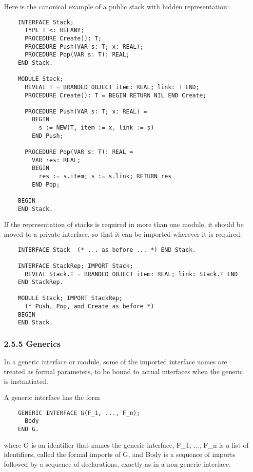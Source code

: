 \documentclass[10pt]{article}
\begin{document}
  Here is the canonical example of a public stack with hidden representation: 
\begin{verbatim}
    INTERFACE Stack;
      TYPE T <: REFANY;
      PROCEDURE Create(): T;
      PROCEDURE Push(VAR s: T; x: REAL);
      PROCEDURE Pop(VAR s: T): REAL;
    END Stack.

    MODULE Stack;
      REVEAL T = BRANDED OBJECT item: REAL; link: T END;
      PROCEDURE Create(): T = BEGIN RETURN NIL END Create;

      PROCEDURE Push(VAR s: T; x: REAL) =
        BEGIN 
          s := NEW(T, item := x, link := s)
        END Push;

      PROCEDURE Pop(VAR s: T): REAL =
        VAR res: REAL;
        BEGIN 
          res := s.item; s := s.link; RETURN res
        END Pop;

    BEGIN
    END Stack.
\end{verbatim}



  If the representation of stacks is required in more than one module, it should be moved to a private interface, so that it can be imported wherever it is required: 
\begin{verbatim}
    INTERFACE Stack  (* ... as before ... *) END Stack.

    INTERFACE StackRep; IMPORT Stack;   
      REVEAL Stack.T = BRANDED OBJECT item: REAL; link: Stack.T END
    END StackRep.

    MODULE Stack; IMPORT StackRep;
      (* Push, Pop, and Create as before *)
    BEGIN
    END Stack.
\end{verbatim}



 
\subsubsection*{2.5.5 Generics}


  In a generic interface or module, some of the imported interface names are treated as formal parameters, to be bound to actual interfaces when the generic is instantiated. 


  A generic interface has the form 
\begin{verbatim}
    GENERIC INTERFACE G(F_1, ..., F_n);
      Body
    END G.
\end{verbatim}
 where G is an identifier that names the generic interface, F\_1, ..., F\_n is a list of identifiers, called the formal imports of G, and Body is a sequence of imports followed by a sequence of declarations, exactly as in a non-generic interface. 
\end{document}
